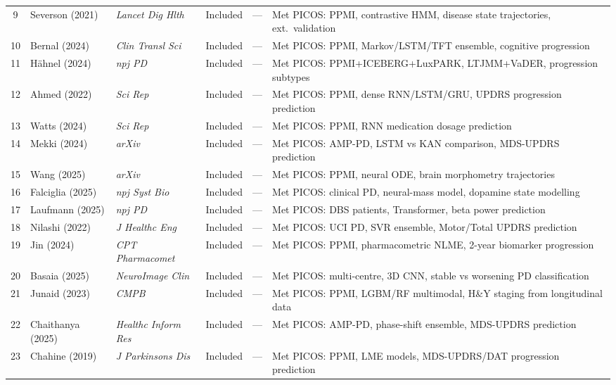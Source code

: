 \documentclass[11pt,a4paper]{article}
\begin{document}
\begin{small}
\begin{longtable}{@{}clp{2.5cm}ccp{5cm}@{}}
9  & Severson (2021)   & \textit{Lancet Dig Hlth} & Included & --- & Met PICOS: PPMI, contrastive HMM, disease state trajectories, ext.\ validation \\
10 & Bernal (2024)     & \textit{Clin Transl Sci} & Included & --- & Met PICOS: PPMI, Markov/LSTM/TFT ensemble, cognitive progression \\
11 & H\"ahnel (2024)   & \textit{npj PD}          & Included & --- & Met PICOS: PPMI+ICEBERG+LuxPARK, LTJMM+VaDER, progression subtypes \\
12 & Ahmed (2022)      & \textit{Sci Rep}         & Included & --- & Met PICOS: PPMI, dense RNN/LSTM/GRU, UPDRS progression prediction \\
13 & Watts (2024)      & \textit{Sci Rep}         & Included & --- & Met PICOS: PPMI, RNN medication dosage prediction \\
14 & Mekki (2024)      & \textit{arXiv}           & Included & --- & Met PICOS: AMP-PD, LSTM vs KAN comparison, MDS-UPDRS prediction \\
15 & Wang (2025)       & \textit{arXiv}           & Included & --- & Met PICOS: PPMI, neural ODE, brain morphometry trajectories \\
16 & Falciglia (2025)  & \textit{npj Syst Bio}    & Included & --- & Met PICOS: clinical PD, neural-mass model, dopamine state modelling \\
17 & Laufmann (2025)   & \textit{npj PD}          & Included & --- & Met PICOS: DBS patients, Transformer, beta power prediction \\
18 & Nilashi (2022)    & \textit{J Healthc Eng}   & Included & --- & Met PICOS: UCI PD, SVR ensemble, Motor/Total UPDRS prediction \\
19 & Jin (2024)        & \textit{CPT Pharmacomet} & Included & --- & Met PICOS: PPMI, pharmacometric NLME, 2-year biomarker progression \\
20 & Basaia (2025)     & \textit{NeuroImage Clin} & Included & --- & Met PICOS: multi-centre, 3D CNN, stable vs worsening PD classification \\
21 & Junaid (2023)     & \textit{CMPB}            & Included & --- & Met PICOS: PPMI, LGBM/RF multimodal, H\&Y staging from longitudinal data \\
22 & Chaithanya (2025) & \textit{Healthc Inform Res} & Included & --- & Met PICOS: AMP-PD, phase-shift ensemble, MDS-UPDRS prediction \\
23 & Chahine (2019)    & \textit{J Parkinsons Dis}& Included & --- & Met PICOS: PPMI, LME models, MDS-UPDRS/DAT progression prediction \\

\end{longtable}
\end{small}
\end{document}
